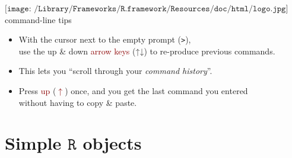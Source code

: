 \documentclass[
  11pt,
  ignorenonframetext,
]{beamer}
\newcommand{\OtherTok}[1]{\textcolor[rgb]{0.56,0.35,0.01}{#1}}
\newcommand{\R}{\texttt{R}}
\newcommand{\important}[1]{\textcolor{darkred}{#1}}
\begin{document}
\begin{frame}{\(\texttt{[image: /Library/Frameworks/R.framework/Resources/doc/html/logo.jpg]}\)
command-line tips}
\protect\hypertarget{includegraphicsheight1emlibraryframeworksr.frameworkresourcesdochtmllogo.jpg-command-line-tips}{}
\begin{itemize}
\item
  With the cursor next to the empty prompt (\OtherTok{\texttt{>}}),\\
  use the up \& down \important{arrow keys} (↑↓) to re-produce previous
  commands.
\item
  This lets you ``scroll through your \emph{command history}''.
\item
  Press \important{up} (\important{$\uparrow$}) once, and you get the
  last command you entered\\
  without having to copy \& paste.
\end{itemize}
\end{frame}

\hypertarget{simple-r-objects}{%
\section{\texorpdfstring{Simple \(\R\)
objects}{Simple \textbackslash R objects}}\label{simple-r-objects}}
\end{document}
